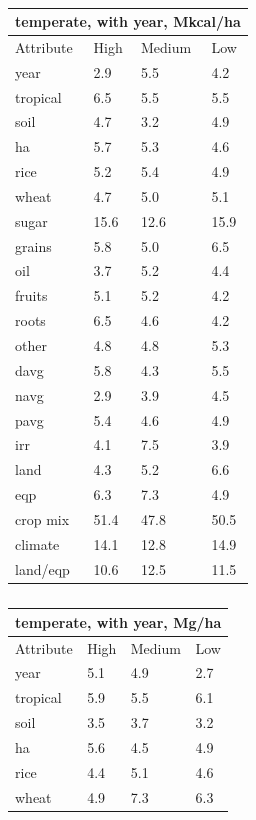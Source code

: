 \documentclass[11pt]{article}
\begin{document}
\begin{table}[h!]
\parbox{.45\linewidth} {
\centering
\begin{tabular}{llll}
\toprule
\multicolumn{4}{c}{\textbf{temperate, with year, Mkcal/ha}} \\
\midrule
Attribute & High & Medium & Low \\
\midrule
year & 2.9 & 5.5 & 4.2 \\
tropical & 6.5 & 5.5 & 5.5 \\
soil & 4.7 & 3.2 & 4.9 \\
ha & 5.7 & 5.3 & 4.6 \\
rice & 5.2 & 5.4 & 4.9 \\
wheat & 4.7 & 5.0 & 5.1 \\
sugar & 15.6 & 12.6 & 15.9 \\
grains & 5.8 & 5.0 & 6.5 \\
oil & 3.7 & 5.2 & 4.4 \\
fruits & 5.1 & 5.2 & 4.2 \\
roots & 6.5 & 4.6 & 4.2 \\
other & 4.8 & 4.8 & 5.3 \\
davg & 5.8 & 4.3 & 5.5 \\
navg & 2.9 & 3.9 & 4.5 \\
pavg & 5.4 & 4.6 & 4.9 \\
irr & 4.1 & 7.5 & 3.9 \\
land & 4.3 & 5.2 & 6.6 \\
eqp & 6.3 & 7.3 & 4.9 \\
\midrule
crop mix & 51.4 & 47.8 & 50.5 \\
climate & 14.1 & 12.8 & 14.9 \\
land/eqp & 10.6 & 12.5 & 11.5 \\
\bottomrule
\end{tabular}
\caption{ }
\label{k.wy.temp_percentages}
}
\parbox{.45\linewidth} {
\centering
\begin{tabular}{llll}
\toprule
\multicolumn{4}{c}{\textbf{temperate, with year, Mg/ha}} \\
\midrule
Attribute & High & Medium & Low \\
\midrule
year & 5.1 & 4.9 & 2.7 \\
tropical & 5.9 & 5.5 & 6.1 \\
soil & 3.5 & 3.7 & 3.2 \\
ha & 5.6 & 4.5 & 4.9 \\
rice & 4.4 & 5.1 & 4.6 \\
wheat & 4.9 & 7.3 & 6.3 \\

\end{tabular}}
\end{table}
\end{document}
